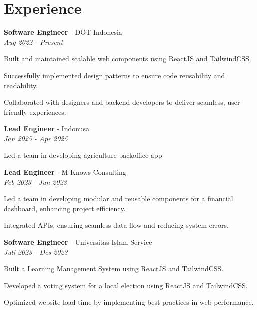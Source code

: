 \section*{Experience}

\textbf{Software Engineer} - DOT Indonesia \\
\textit{Aug 2022 - Present}
\begin{highlights}
    \item Built and maintained scalable web components using ReactJS and TailwindCSS.
    \item Successfully implemented design patterns to ensure code reusability and readability.
    \item Collaborated with designers and backend developers to deliver seamless, user-friendly experiences.
\end{highlights}

\vspace{1em}

\textbf{Lead Engineer} - Indonusa \\
\textit{Jan 2025 - Apr 2025}
\begin{highlights}
    \item Led a team in developing agriculture backoffice app
\end{highlights}

\vspace{1em}

\textbf{Lead Engineer} - M-Knows Consulting \\
\textit{Feb 2023 - Jun 2023}
\begin{highlights}
    \item Led a team in developing modular and reusable components for a financial dashboard, enhancing project efficiency.
    \item Integrated APIs, ensuring seamless data flow and reducing system errors.
\end{highlights}

\vspace{1em}

\textbf{Software Engineer} - Universitas Islam Service \\
\textit{Juli 2023 - Des 2023}
\begin{highlights}
    \item Built a Learning Management System using ReactJS and TailwindCSS.
    \item Developed a voting system for a local election using ReactJS and TailwindCSS.
    \item Optimized website load time by implementing best practices in web performance.
\end{highlights}

